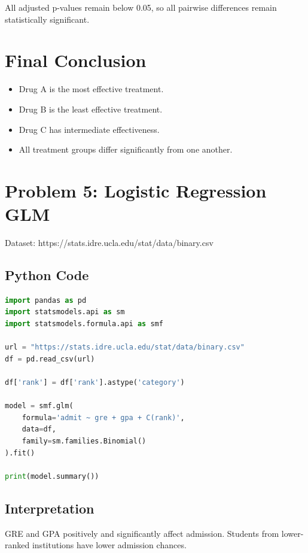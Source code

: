 \documentclass[12pt]{article}
\begin{document}
All adjusted p-values remain below 0.05, so all pairwise differences remain statistically significant.

\section*{Final Conclusion}

\begin{itemize}
    \item Drug A is the most effective treatment.
    \item Drug B is the least effective treatment.
    \item Drug C has intermediate effectiveness.
    \item All treatment groups differ significantly from one another.
\end{itemize}


\newpage

\section*{Problem 5: Logistic Regression GLM}

Dataset:
https://stats.idre.ucla.edu/stat/data/binary.csv

\subsection*{Python Code}

\begin{lstlisting}[language=Python]
import pandas as pd
import statsmodels.api as sm
import statsmodels.formula.api as smf

url = "https://stats.idre.ucla.edu/stat/data/binary.csv"
df = pd.read_csv(url)

df['rank'] = df['rank'].astype('category')

model = smf.glm(
    formula='admit ~ gre + gpa + C(rank)',
    data=df,
    family=sm.families.Binomial()
).fit()

print(model.summary())
\end{lstlisting}

\subsection*{Interpretation}

GRE and GPA positively and significantly affect admission.
Students from lower-ranked institutions have lower admission chances.
\end{document}
